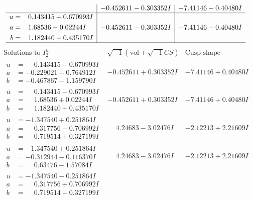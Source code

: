 \documentclass[1p]{elsarticle_modified}
\theoremstyle{definition}
\newcommand{\I}{\sqrt{-1}}
\begin{document}
$$\begin{array}{c|c|c}
 & -0.452611 - 0.303352 I & -7.41146 - 0.40480 I \\ \hline\begin{aligned}
u &= \phantom{-}0.143415 + 0.670993 I \\
a &= \phantom{-}1.68536 - 0.02244 I \\
b &= \phantom{-}1.182440 - 0.435170 I\end{aligned}
 & -0.452611 - 0.303352 I & -7.41146 - 0.40480 I\\
 \hline 
 \end{array}$$\newpage$$\begin{array}{c|c|c}  
\text{Solutions to }I^u_{2}& \I (\text{vol} + \sqrt{-1}CS) & \text{Cusp shape}\\
 \hline 
\begin{aligned}
u &= \phantom{-}0.143415 - 0.670993 I \\
a &= -0.229021 - 0.764912 I \\
b &= -0.467867 - 1.159790 I\end{aligned}
 & -0.452611 + 0.303352 I & -7.41146 + 0.40480 I \\ \hline\begin{aligned}
u &= \phantom{-}0.143415 - 0.670993 I \\
a &= \phantom{-}1.68536 + 0.02244 I \\
b &= \phantom{-}1.182440 + 0.435170 I\end{aligned}
 & -0.452611 + 0.303352 I & -7.41146 + 0.40480 I \\ \hline\begin{aligned}
u &= -1.347540 + 0.251864 I \\
a &= \phantom{-}0.317756 - 0.706992 I \\
b &= \phantom{-}0.719514 + 0.327199 I\end{aligned}
 & \phantom{-}4.24683 - 3.02476 I & -2.12213 + 2.21609 I \\ \hline\begin{aligned}
u &= -1.347540 + 0.251864 I \\
a &= -0.312944 - 0.116370 I \\
b &= \phantom{-}0.63476 - 1.57084 I\end{aligned}
 & \phantom{-}4.24683 - 3.02476 I & -2.12213 + 2.21609 I \\ \hline\begin{aligned}
u &= -1.347540 - 0.251864 I \\
a &= \phantom{-}0.317756 + 0.706992 I \\
b &= \phantom{-}0.719514 - 0.327199 I\end{aligned}

\end{array}$$
\end{document}
